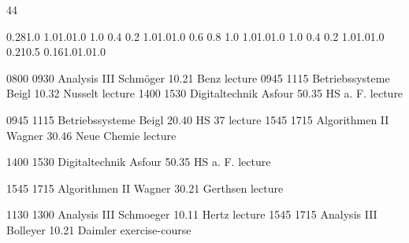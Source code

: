 \documentclass[a4paper,10pt]{report}
\begin{document}
\thispagestyle{empty}
\begin{landscape}
\noindent{}

\setslotsize{2.8cm}{0.3cm}
 {44}
\settextframe{0.8mm}

\seteventcornerradius{0pt}


 {0.28}{1.0} {1.0}{1.0}{1.0}
    {1.0} {0.4} {0.2} {1.0}{1.0}{1.0}
   {0.6} {0.8} {1.0} {1.0}{1.0}{1.0}
 {1.0} {0.4} {0.2} {1.0}{1.0}{1.0}
       {0.21}{0.5} {0.16}{1.0}{1.0}{1.0}

\begin{timetable}
   {0800} {0930} {Analysis III}                           {Schmöger}             {10.21 Benz}      {lecture}
   {0945} {1115} {Betriebssysteme}                        {Beigl}                {10.32 Nusselt}   {lecture}
   {1400} {1530} {Digitaltechnik}                         {Asfour}               {50.35 HS a. F.}  {lecture}

   {0945} {1115} {Betriebssysteme}                        {Beigl}                {20.40 HS 37}     {lecture}
   {1545} {1715} {Algorithmen II}                         {Wagner}               {30.46 Neue Chemie} {lecture}

   {1400} {1530} {Digitaltechnik}                         {Asfour}               {50.35 HS a. F.}  {lecture}

   {1545} {1715} {Algorithmen II}                         {Wagner}               {30.21 Gerthsen}  {lecture}

   {1130} {1300} {Analysis III}                           {Schmoeger}            {10.11 Hertz}     {lecture}
   {1545} {1715} {Analysis III}                           {Bolleyer}             {10.21 Daimler}   {exercise-course}
\end{timetable}

\end{landscape}
\end{document}
